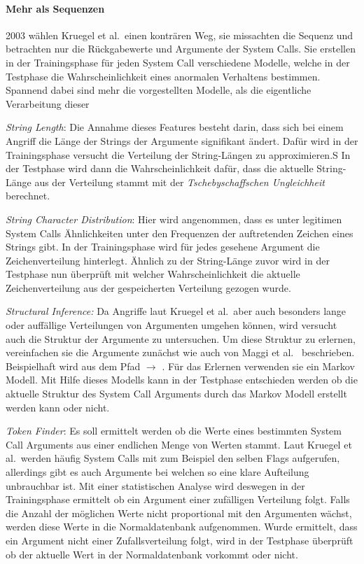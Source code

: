     \paragraph{Mehr als Sequenzen}

        {\color{red}2003 wählen Kruegel et al.\ einen konträren Weg, sie missachten die Sequenz und betrachten nur die Rückgabewerte und Argumente der System Calls.}
        Sie erstellen in der Trainingsphase für jeden System Call verschiedene Modelle, welche in der Testphase die Wahrscheinlichkeit eines anormalen Verhaltens bestimmen.
        Spannend dabei sind mehr die vorgestellten Modelle, als die eigentliche Verarbeitung dieser

        \textit{String Length}: Die Annahme dieses Features besteht darin, dass sich bei einem Angriff die Länge der Strings der Argumente signifikant ändert.
        Dafür wird in der Trainingsphase versucht die Verteilung der String-Längen zu approximieren.S
        In der Testphase wird dann die Wahrscheinlichkeit dafür, dass die aktuelle String-Länge aus der Verteilung stammt mit der \textit{Tschebyschaffschen Ungleichheit} berechnet.
        
        \textit{String Character Distribution}: Hier wird angenommen, dass es unter legitimen System Calls Ähnlichkeiten unter den Frequenzen der auftretenden Zeichen eines Strings gibt.
        In der Trainingsphase wird für jedes gesehene Argument die Zeichenverteilung hinterlegt.
        Ähnlich zu der String-Länge zuvor wird in der Testphase nun überprüft mit welcher Wahrscheinlichkeit die aktuelle Zeichenverteilung aus der gespeicherten Verteilung gezogen wurde.

        \textit{Structural Inference:} Da Angriffe laut Kruegel et al.\ aber auch besonders lange oder auffällige Verteilungen von Argumenten umgehen können, wird versucht auch die Struktur der Argumente zu untersuchen.
        Um diese Struktur zu erlernen, vereinfachen sie die Argumente zunächst wie auch von Maggi et al.~\cite{ARGUMENTS2} beschrieben.
        Beispielhaft wird aus dem Pfad  $\longrightarrow$ .
        Für das Erlernen verwenden sie ein Markov Modell.
        Mit Hilfe dieses Modells kann in der Testphase entschieden werden ob die aktuelle Struktur des System Call Arguments durch das Markov Modell erstellt werden kann oder nicht.

        \textit{Token Finder}: Es soll ermittelt werden ob die Werte eines bestimmten System Call Arguments aus einer endlichen Menge von Werten stammt.
        Laut Kruegel et al.\ werden häufig System Calls mit zum Beispiel den selben Flags aufgerufen, allerdings gibt es auch Argumente bei welchen so eine klare Aufteilung unbrauchbar ist.
        Mit einer statistischen Analyse wird deswegen in der Trainingsphase ermittelt ob ein Argument einer zufälligen Verteilung folgt.
        Falls die Anzahl der möglichen Werte nicht proportional mit den Argumenten wächst, werden diese Werte in die Normaldatenbank aufgenommen.
        Wurde ermittelt, dass ein Argument nicht einer Zufallsverteilung folgt, wird in der Testphase überprüft ob der aktuelle Wert in der Normaldatenbank vorkommt oder nicht.


